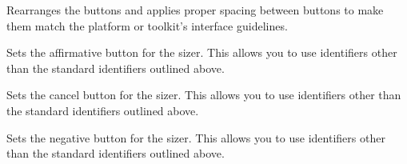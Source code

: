 \label{wxstddialogbuttonsizerfinalise}


Rearranges the buttons and applies proper spacing between buttons to make them match the platform or toolkit's interface guidelines.

\label{wxstddialogbuttonsizersetaffirmativebutton}


Sets the affirmative button for the sizer. This allows you to use identifiers other than the standard identifiers outlined above.

\label{wxstddialogbuttonsizersetcancelbutton}


Sets the cancel button for the sizer. This allows you to use identifiers other than the standard identifiers outlined above.

\label{wxstddialogbuttonsizersetnegativebutton}


Sets the negative button for the sizer. This allows you to use identifiers other than the standard identifiers outlined above.

